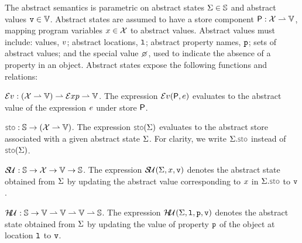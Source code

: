The abstract semantics is parametric on abstract states $\Sigma \in \mathbb{S}$ and abstract values $\mathtt{v} \in \mathbb{V}$.
Abstract states are assumed to have a store component ${\sf P}: \mathcal{X} \rightharpoonup \mathbb{V}$, mapping program variables $x \in \mathcal{X}$ to abstract values. Abstract values must include: \jsil values, $v$; abstract locations, $\mathtt{l}$; abstract property names, $\mathtt{p}$; sets of abstract values; and the special value $\none$, used to indicate the absence of a property in an object. Abstract states expose the following functions and relations: 
\begin{description}
\setlength{\itemsep}{0.2em}
  \item[\jsil Expression Evaluation,] $\mathcal{E}v_{} :  (\mathcal{X} \rightharpoonup \mathbb{V})  \rightharpoonup \mathcal{E}xp \rightharpoonup \mathbb{V}$. 
  	The expression $\mathcal{E}v_{}({\sf P}, e)$ evaluates to the abstract value of the \jsil expression $e$ under store ${\sf P}$. 
            
  \item[Store Selector,] $\stosel : \absstates \rightarrow (\jvars \partialmap \absvals)$. The expression $\stosel(\absstate)$ evaluates to the abstract store associated with a given abstract state $\Sigma$. For clarity, we write $\absstate.\stosel$ instead of $\stosel(\absstate)$. 
             
  \item[Store Update,] $\mathcal{S\!U}_{}: \mathbb{S} \rightarrow \mathcal{X} \rightarrow \mathbb{V} \rightarrow \mathbb{S}$. 
             The expression $\mathcal{S\!U}_{}(\Sigma, x, \mathtt{v})$ denotes the abstract state obtained from $\Sigma$ 
             by updating the abstract value corresponding to $x$ in $\absstate.\stosel$ to $\mathtt{v}$. 

   \item[Heap Update,] $\mathcal{H\!U}_{} : \mathbb{S} \rightarrow \mathbb{V} \rightharpoonup \mathbb{V} \rightharpoonup \mathbb{V} \rightharpoonup \mathbb{S}$. 
             The expression $\mathcal{H\!U}_{}(\Sigma, \mathtt{l}, \mathtt{p}, \mathtt{v})$ denotes the abstract state obtained from $\Sigma$ 
             by updating the value of property $\mathtt{p}$ of the object at location $\mathtt{l}$ to $\mathtt{v}$. 
                   

\end{description}
